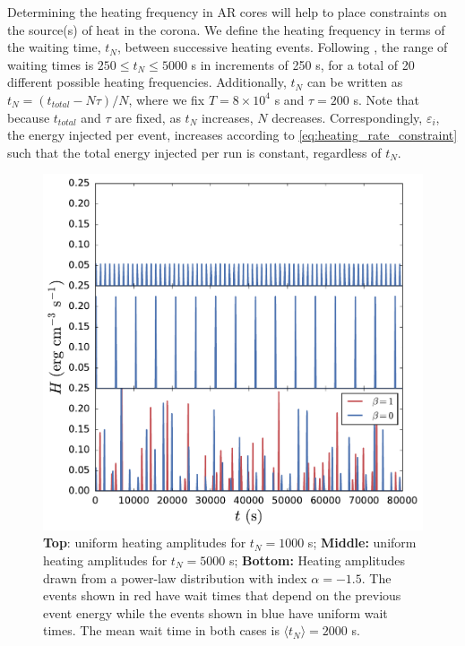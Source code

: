 \documentclass[apj]{emulateapj}
\begin{document}
	\par Determining the heating frequency in AR cores will help to place constraints on the source(s) of heat in the corona. We define the heating frequency in terms of the waiting time, $t_N$, between successive heating events. Following \citet{cargill_active_2014}, the range of waiting times is $250\le t_N\le5000$ s in increments of 250 s, for a total of 20 different possible heating frequencies. Additionally, $t_N$ can be written as $t_N=(t_{total}-N\tau)/N$, where we fix $T=8\times10^4$ s and $\tau=200$ s. Note that because $t_{total}$ and $\tau$ are fixed, as $t_N$ increases, $N$ decreases. Correspondingly, $\varepsilon_i$, the energy injected per event, increases according to \autoref{eq:heating_rate_constraint} such that the total energy injected per run is constant, regardless of $t_N$.
	\begin{figure}
		\centering
		\includegraphics[width=\columnwidth]{figures/heating_functions.pdf}
		\caption{\textbf{Top}: uniform heating amplitudes for $t_N=1000$ s; \textbf{Middle:} uniform heating amplitudes for $t_N=5000$ s; \textbf{Bottom:} Heating amplitudes drawn from a power-law distribution with index $\alpha=-1.5$. The events shown in red have wait times that depend on the previous event energy while the events shown in blue have uniform wait times. The mean wait time in both cases is $\langle t_N\rangle=2000$ s.}
		\label{fig:heating_funcs}
	\end{figure}
\end{document}
